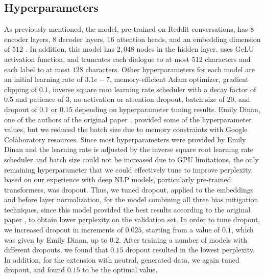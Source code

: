 \subsection{Hyperparameters}
As previously mentioned, the model, pre-trained on Reddit conversations, has $8$ encoder layers, $8$ decoder layers, $16$ attention heads, and an embedding dimension of $512$ \supercite{redditmodel}. In addition, this model has $2,048$ nodes in the hidden layer, uses GeLU activation function, and truncates each dialogue to at most $512$ characters and each label to at most $128$ characters. Other hyperparameters for each model are an initial learning rate of $3.1e-7$, memory-efficient Adam optimizer, gradient clipping of $0.1$, inverse square root learning rate scheduler with a decay factor of $0.5$ and patience of $3$, no activation or attention dropout, batch size of $20$, and dropout of $0.1$ or $0.15$ depending on hyperparameter tuning results. Emily Dinan, one of the authors of the original paper \supercite{dinan2020}, provided some of the hyperparameter values, but we reduced the batch size due to memory constraints with Google Colaboratory resources. Since most hyperparameters were provided by Emily Dinan and the learning rate is adjusted by the inverse square root learning rate scheduler and batch size could not be increased due to GPU limitations, the only remaining hyperparameter that we could effectively tune to improve perplexity, based on our experience with deep NLP models, particularly pre-trained transformers, was dropout. Thus, we tuned dropout, applied to the embeddings and before layer normalization, for the model combining all three bias mitigation techniques, since this model provided the best results according to the original paper \supercite{dinan2020}, to obtain lower perplexity on the validation set. In order to tune dropout, we increased dropout in increments of $0.025$, starting from a value of $0.1$, which was given by Emily Dinan, up to $0.2$. After training a number of models with different dropouts, we found that $0.15$ dropout resulted in the lowest perplexity. In addition, for the extension with neutral, generated data, we again tuned dropout, and found $0.15$ to be the optimal value.

